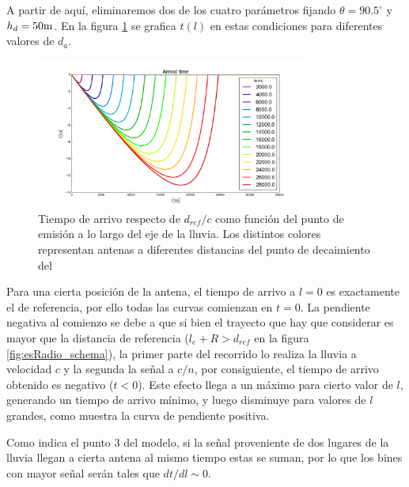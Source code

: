 	A partir de aquí, eliminaremos dos de los cuatro parámetros fijando $\theta=90.5^\circ$ y $h_d=50 \rm m$.
	En la figura \ref{fig:timeDelay_at} se grafica $t(l)$ en estas condiciones para diferentes valores de $d_a$.
	\begin{figure}[ht!]
		\centering
		\includegraphics[width=0.8\textwidth]{./fig/EASRadio/timeDelay_at}
		\caption{\label{fig:timeDelay_at}
		Tiempo de arrivo respecto de $d_{ref}/c$ como funci\'on del punto de emisi\'on a lo largo del eje de la lluvia. Los distintos colores representan antenas a diferentes distancias del punto de decaimiento del \tauon{} 
		}
	\end{figure}
	Para una cierta posición de la antena, el tiempo de arrivo a $l=0$ es exactamente el de referencia, por ello todas las curvas comienzan en $t = 0$.
	La pendiente negativa al comienzo se debe a que si bien el trayecto que hay que considerar es mayor que la distancia de referencia ($l_e+R>d_{ref}$ en la figura \ref{fig:esRadio_schema}), la primer parte del recorrido lo realiza la lluvia a velocidad $c$ y la segunda la señal a $c/n$,  por consiguiente, el tiempo de arrivo obtenido es negativo ($t<0$).
	Este efecto llega a un máximo para cierto valor de $l$, generando un tiempo de arrivo mínimo, y luego disminuye para valores de $l$ grandes, como muestra la curva de pendiente positiva.
	
	Como indica el punto 3 del modelo, si la señal proveniente de dos lugares de la lluvia llegan a cierta antena al mismo tiempo estas se suman, por lo que los bines con mayor señal serán tales que $dt/dl\sim0$.
	
